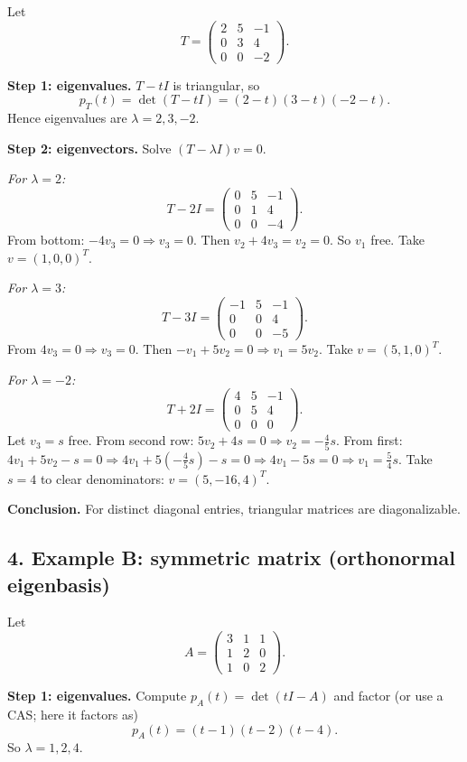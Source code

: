 \documentclass[12pt,a4paper]{article}
\theoremstyle{plain}
\theoremstyle{definition}      %
\begin{document}
Let
\[
T=\begin{pmatrix}
	2&5&-1\\
	0&3&4\\
	0&0&-2
\end{pmatrix}.
\]

\textbf{Step 1: eigenvalues.}
$T-tI$ is triangular, so
\[
p_T(t)=\det(T-tI)=(2-t)(3-t)(-2-t).
\]
Hence eigenvalues are $\lambda=2,3,-2$.

\textbf{Step 2: eigenvectors.}
Solve $(T-\lambda I)v=0$.

\emph{For $\lambda=2$:}
\[
T-2I=\begin{pmatrix}0&5&-1\\0&1&4\\0&0&-4\end{pmatrix}.
\]
From bottom: $-4v_3=0\Rightarrow v_3=0$.
Then $v_2+4v_3=v_2=0$.
So $v_1$ free. Take $v=(1,0,0)^T$.

\emph{For $\lambda=3$:}
\[
T-3I=\begin{pmatrix}-1&5&-1\\0&0&4\\0&0&-5\end{pmatrix}.
\]
From $4v_3=0\Rightarrow v_3=0$.
Then $-v_1+5v_2=0\Rightarrow v_1=5v_2$.
Take $v=(5,1,0)^T$.

\emph{For $\lambda=-2$:}
\[
T+2I=\begin{pmatrix}4&5&-1\\0&5&4\\0&0&0\end{pmatrix}.
\]
Let $v_3=s$ free. From second row: $5v_2+4s=0\Rightarrow v_2=-\frac45 s$.
From first: $4v_1+5v_2-s=0\Rightarrow 4v_1+5(-\frac45 s)-s=0\Rightarrow 4v_1-5s=0\Rightarrow v_1=\frac54 s$.
Take $s=4$ to clear denominators: $v=(5,-16,4)^T$.

\textbf{Conclusion.} For distinct diagonal entries, triangular matrices are diagonalizable.

\subsection*{4. Example B: symmetric matrix (orthonormal eigenbasis)}

Let
\[
A=\begin{pmatrix}
	3&1&1\\
	1&2&0\\
	1&0&2
\end{pmatrix}.
\]

\textbf{Step 1: eigenvalues.}
Compute $p_A(t)=\det(tI-A)$ and factor (or use a CAS; here it factors as)
\[
p_A(t)=(t-1)(t-2)(t-4).
\]
So $\lambda=1,2,4$.
\end{document}
